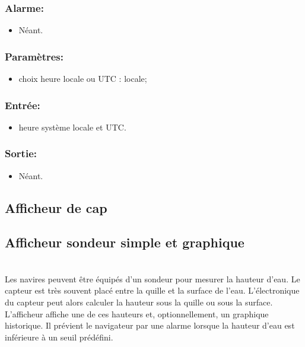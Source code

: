 \documentclass[a4paper,11pt]{report}
\begin{document}
\subsubsection{Alarme:}
\begin{itemize}
	\item Néant.
\end{itemize}

\subsubsection{Paramètres:}
\begin{itemize}
	\item choix heure locale ou UTC : locale;
\end{itemize}

\subsubsection{Entrée:}
\begin{itemize}
	\item heure système locale et UTC.
\end{itemize}

\subsubsection{Sortie:}
\begin{itemize}
	\item Néant.
\end{itemize}

\subsection{Afficheur de cap}



\subsection{Afficheur sondeur simple et graphique}

\\
Les navires peuvent être équipés d'un sondeur pour mesurer la hauteur d'eau.
Le capteur est très souvent placé entre la quille et la surface de
l'eau. L'électronique du capteur peut alors calculer la hauteur sous la quille
ou sous la surface.
L'afficheur affiche une de ces hauteurs et, optionnellement, un graphique historique.
Il prévient le navigateur par une alarme lorsque la hauteur d'eau est inférieure
à un seuil prédéfini.
\end{document}
